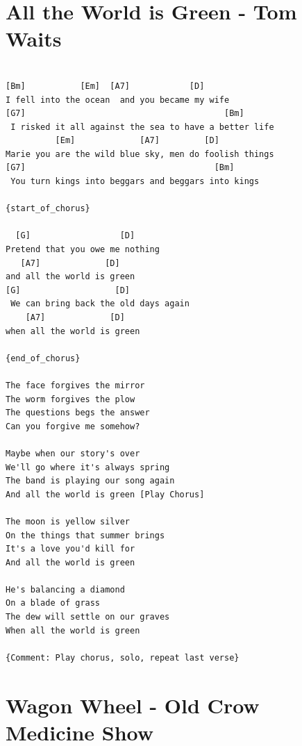 \documentclass[
]{book}
\let\stdsection\section
\renewcommand\section{\clearpage\stdsection}
\begin{document}
\hypertarget{all-the-world-is-green---tom-waits}{%
\section{All the World is Green - Tom Waits}\label{all-the-world-is-green---tom-waits}}

\begin{verbatim}

[Bm]           [Em]  [A7]            [D]
I fell into the ocean  and you became my wife
[G7]                                        [Bm]
 I risked it all against the sea to have a better life
          [Em]             [A7]         [D]
Marie you are the wild blue sky, men do foolish things
[G7]                                      [Bm]
 You turn kings into beggars and beggars into kings

{start_of_chorus}

  [G]                  [D] 
Pretend that you owe me nothing      
   [A7]             [D]
and all the world is green
[G]                   [D]        
 We can bring back the old days again     
    [A7]             [D]
when all the world is green

{end_of_chorus}

The face forgives the mirror
The worm forgives the plow
The questions begs the answer
Can you forgive me somehow?

Maybe when our story's over
We'll go where it's always spring
The band is playing our song again
And all the world is green [Play Chorus]

The moon is yellow silver
On the things that summer brings
It's a love you'd kill for
And all the world is green

He's balancing a diamond
On a blade of grass
The dew will settle on our graves
When all the world is green

{Comment: Play chorus, solo, repeat last verse}
\end{verbatim}

\hypertarget{wagon-wheel---old-crow-medicine-show}{%
\section{Wagon Wheel - Old Crow Medicine Show}\label{wagon-wheel---old-crow-medicine-show}}
\end{document}
